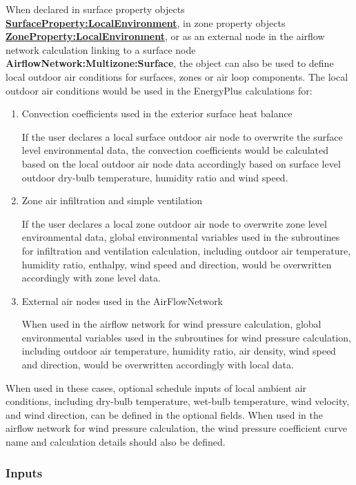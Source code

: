 When declared in surface property objects \textbf{\hyperref[surfacePropertylocalEnvironment]{SurfaceProperty:LocalEnvironment}}, in zone property objects \textbf{\hyperref[ZonePropertylocalEnvironment]{ZoneProperty:LocalEnvironment}}, or as an external node in the airflow network calculation linking to a surface node \textbf{AirflowNetwork:Multizone:Surface}, the object can also be used to define local outdoor air conditions for surfaces, zones or air loop components. The local outdoor air conditions would be used in the EnergyPlus calculations for:
\begin{enumerate}
\item Convection coefficients used in the exterior surface heat balance

If the user declares a local surface outdoor air node to overwrite the surface level environmental data, the convection coefficients would be calculated based on the local outdoor air node data accordingly based on surface level outdoor dry-bulb temperature, humidity ratio and wind speed.

\item Zone air infiltration and simple ventilation

If the user declares a local zone outdoor air node to overwrite zone level environmental data, global environmental variables used in the subroutines for infiltration and ventilation calculation, including outdoor air temperature, humidity ratio, enthalpy, wind speed and direction, would be overwritten accordingly with zone level data.

\item External air nodes used in the AirFlowNetwork

When used in the airflow network for wind pressure calculation, global environmental variables used in the subroutines for wind pressure calculation, including outdoor air temperature, humidity ratio, air density, wind speed and direction, would be overwritten accordingly with local data.

\end{enumerate}

When used in these cases, optional schedule inputs of local ambient air conditions, including dry-bulb temperature, wet-bulb temperature, wind velocity, and wind direction, can be defined in the optional fields. When used in the airflow network for wind pressure calculation, the wind pressure coefficient curve name and calculation details should also be defined.

\subsubsection{Inputs}\label{inputs-5-001}

